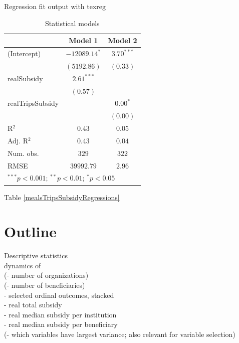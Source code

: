 \documentclass[12pt, a4paper, titlepage]{article}\usepackage[]{graphicx}\usepackage[]{color}
\begin{document}
Regression fit output with texreg\\


\begin{table}
\begin{center}
\begin{tabular}{l c c}
\hline
 & Model 1 & Model 2 \\
\hline
(Intercept)      & $-12089.14^{*}$ & $3.70^{***}$ \\
                 & $(5192.86)$     & $(0.33)$     \\
realSubsidy      & $2.61^{***}$    &              \\
                 & $(0.57)$        &              \\
realTripsSubsidy &                 & $0.00^{*}$   \\
                 &                 & $(0.00)$     \\
\hline
R$^2$            & $0.43$          & $0.05$       \\
Adj. R$^2$       & $0.43$          & $0.04$       \\
Num. obs.        & $329$           & $322$        \\
RMSE             & $39992.79$      & $2.96$       \\
\hline
\multicolumn{3}{l}{\scriptsize{$^{***}p<0.001$; $^{**}p<0.01$; $^{*}p<0.05$}}
\end{tabular}
\caption{Statistical models}
\label{table:coefficients}
\end{center}
\end{table}


Table \ref{mealsTripsSubsidyRegressions}
\section{Outline}
Descriptive statistics\\
dynamics of\\ 
(- number of organizations)\\
(- number of beneficiaries)\\
- selected ordinal outcomes, stacked\\
- real total subsidy\\
- real median subsidy per institution\\
- real median subsidy per beneficiary\\
(- which variables have largest variance; also relevant for variable selection)\\
\end{document}
